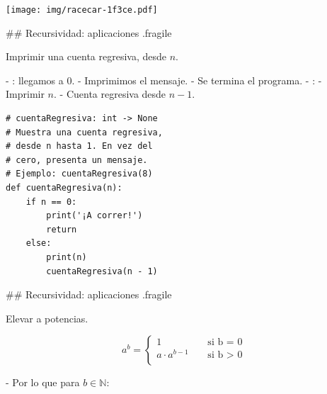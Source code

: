 \bgncolumns
{}

\pause
{}\newline
\pause
{}\newline
\pause
{}\newline
\pause
{}\newline
\pause
{}


\texttt{[image: img/racecar-1f3ce.pdf]}

\trmcolumns

## Recursividad: aplicaciones {.fragile}

\bgnblockgood
{} Imprimir una cuenta regresiva, desde $n$.
\trmblockgood

\vspace{-1ex}

\pause

\bgncolumns[-1ex]

- : llegamos a 0.
    - Imprimimos el mensaje.
    - Se termina el programa.
- :
    - Imprimir $n$.
    - Cuenta regresiva desde $n - 1$.


\begin{lstlisting}[style=frame02]
# cuentaRegresiva: int -> None
# Muestra una cuenta regresiva,
# desde n hasta 1. En vez del
# cero, presenta un mensaje.
# Ejemplo: cuentaRegresiva(8)
def cuentaRegresiva(n):
    if n == 0:
        print('¡A correr!')
        return
    else:
        print(n)
        cuentaRegresiva(n - 1)
\end{lstlisting}

\trmcolumns

## Recursividad: aplicaciones {.fragile}

\bgnblockgood
{} Elevar a potencias.
\trmblockgood

$$ a^b = \begin{cases}
        1               & \;\;\;\;\text{si b = 0} \\
        a \cdot a^{b-1} & \;\;\;\;\text{si b > 0} \\
    \end{cases}
$$

\vspace{1ex}

- Por lo que para $b \in \mathbb{N}$:

